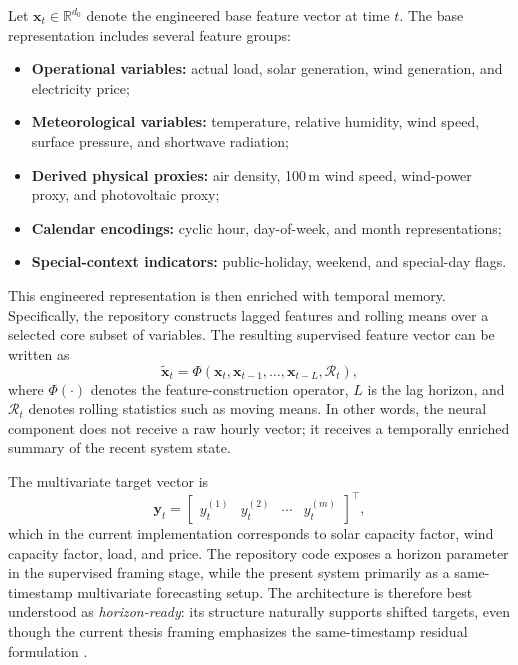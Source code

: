 Let $\mathbf{x}_t \in \mathbb{R}^{d_0}$ denote the engineered base feature vector at time $t$. The base representation includes several feature groups:
\begin{itemize}
	\item \textbf{Operational variables:} actual load, solar generation, wind generation, and electricity price;
	\item \textbf{Meteorological variables:} temperature, relative humidity, wind speed, surface pressure, and shortwave radiation;
	\item \textbf{Derived physical proxies:} air density, 100\,m wind speed, wind-power proxy, and photovoltaic proxy;
	\item \textbf{Calendar encodings:} cyclic hour, day-of-week, and month representations;
	\item \textbf{Special-context indicators:} public-holiday, weekend, and special-day flags.
\end{itemize}

This engineered representation is then enriched with temporal memory. Specifically, the repository constructs lagged features and rolling means over a selected core subset of variables. The resulting supervised feature vector can be written as
\begin{equation}
	\tilde{\mathbf{x}}_t
	=
	\Phi\!\left(
	\mathbf{x}_t,
	\mathbf{x}_{t-1},
	\ldots,
	\mathbf{x}_{t-L},
	\mathcal{R}_t
	\right),
	\label{eq:neural_supervised}
\end{equation}
where $\Phi(\cdot)$ denotes the feature-construction operator, $L$ is the lag horizon, and $\mathcal{R}_t$ denotes rolling statistics such as moving means. In other words, the neural component does not receive a raw hourly vector; it receives a temporally enriched summary of the recent system state.

The multivariate target vector is
\begin{equation}
	\mathbf{y}_t
	=
	\begin{bmatrix}
		y_t^{(1)} &
		y_t^{(2)} &
		\cdots &
		y_t^{(m)}
	\end{bmatrix}^{\top},
	\label{eq:neural_targets}
\end{equation}
which in the current implementation corresponds to solar capacity factor, wind capacity factor, load, and price. The repository code exposes a horizon parameter in the supervised framing stage, while the present system primarily as a same-timestamp multivariate forecasting setup. The architecture is therefore best understood as \emph{horizon-ready}: its structure naturally supports shifted targets, even though the current thesis framing emphasizes the same-timestamp residual formulation \cite{repo_thesis_grid_anomaly}.

